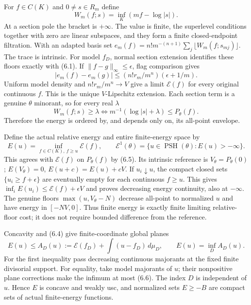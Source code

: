 \documentclass[10pt]{article}
\newcommand{\PSH}{\operatorname{PSH}}
\newcommand{\E}{\mathcal E}
\begin{document}
For $f\in C(K)$ and $0\ne s\in R_m$ define
\[
 W_m(f;s)=\inf_K(mf-\log|s|).
\]
At a section pole the bracket is $+\infty$. The value is finite, the superlevel
conditions together with zero are linear subspaces, and they form a finite
closed-endpoint filtration. With an adapted basis set
$e_m(f)=n!m^{-(n+1)}\sum_j\lfloor W_m(f;s_{mj})\rfloor$.
The trace is intrinsic. For model $f_D$, normal section extension identifies
these floors exactly with (6.1). If $\|f-g\|_\infty\leq\epsilon$, flag
comparison gives
\[
 |e_m(f)-e_m(g)|\leq(n!r_m/m^n)(\epsilon+1/m).
\]
Uniform model density and $n!r_m/m^n\to V$ give a limit $\mathscr E(f)$ for
every original continuous $f$. This is the unique $V$-Lipschitz extension.
Each section term is a genuine $\theta$ minorant, so for every real $\lambda$
\[
 W_m(f;s)\geq\lambda\iff m^{-1}(\log|s|+\lambda)\leq P_\theta(f).
                                                               \tag{6.5}
\]
Therefore the energy is ordered by, and depends only on, its all-point envelope.

Define the actual relative energy and entire finite-energy space by
\[
 E(u)=\inf_{f\in C(K),\ f\geq u}\mathscr E(f),\qquad
 \E^1(\theta)=\{u\in\PSH(\theta):E(u)>-\infty\}.       \tag{6.6}
\]
This agrees with $\mathscr E(f)$ on $P_\theta(f)$ by (6.5). Its intrinsic
reference is $V_\theta=P_\theta(0)$; $E(V_\theta)=0$, $E(u+c)=E(u)+cV$.
If $u_i\downarrow u$, the compact closed sets $\{u_i\geq f+\epsilon\}$
are eventually empty for each continuous $f\geq u$. This gives
$\inf_iE(u_i)\leq\mathscr E(f)+\epsilon V$ and proves decreasing energy
continuity, also at $-\infty$. The genuine floors
$\max(u,V_\theta-N)$ decrease all-point to normalized $u$ and have energy in
$[-NV,0]$. Thus finite energy is exactly finite limiting relative-floor cost;
it does not require bounded difference from the reference.

Concavity and (6.4) give finite-coordinate global planes
\[
 E(u)\leq A_D(u):=\mathscr E(f_D)+\int(u-f_D)\,d\mu_D,
 \qquad E(u)=\inf_D A_D(u).                           \tag{6.7}
\]
For the first inequality pass decreasing continuous majorants at the fixed
finite divisorial support. For equality, take model majorants of $u$; their
nonpositive plane corrections make the infimum at most (6.6). The index $D$
is independent of $u$. Hence $E$ is concave and weakly usc, and normalized
sets $E\geq-B$ are compact sets of actual finite-energy functions.
\end{document}
